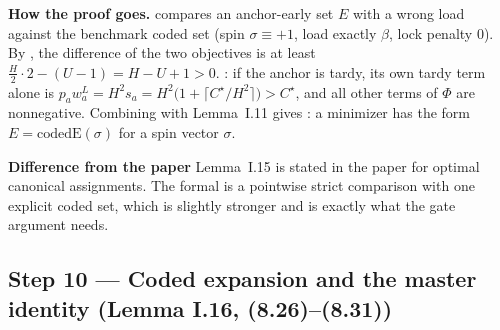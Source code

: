 \documentclass[11pt]{article}
\newcommand{\notelabel}[1]{{\sffamily\bfseries\small\color{noterule}#1}\quad}
\begin{document}
\textbf{How the proof goes.}  compares an anchor-early set $E$ with a wrong
load against the benchmark coded set (spin $\sigma\equiv+1$, load exactly $\beta$, lock
penalty $0$). By , the difference of the two objectives is at least
$\frac H2\cdot2-(U-1)=H-U+1>0$. : if the anchor is tardy, its own tardy term
alone is $p_aw^L_a=H^2s_a=H^2\bigl(1+\lceil C^\star/H^2\rceil\bigr)>C^\star$, and all other
terms of $\Phi$ are nonnegative. Combining  with Lemma~I.11 gives
: a minimizer has the form $E=\mathrm{codedE}(\sigma)$ for a spin vector
$\sigma$.

\begin{notebox}
\notelabel{Difference from the paper}
Lemma~I.15 is stated in the paper for optimal canonical assignments. The formal
 is a pointwise strict comparison with one explicit coded set, which is
slightly stronger and is exactly what the gate argument needs.
\end{notebox}

\subsection{Step 10 --- Coded expansion and the master identity (Lemma I.16, (8.26)--(8.31))}\label{step:master}
\end{document}
